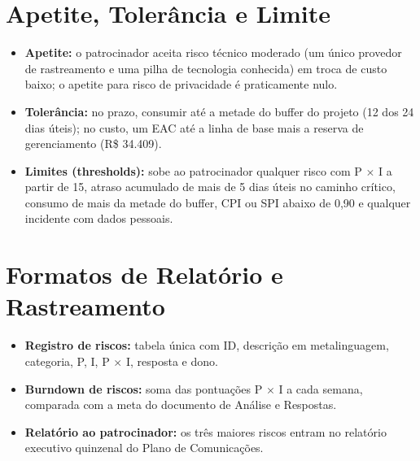 \documentclass[11pt,a4paper]{article}
\begin{document}
\section{Apetite, Tolerância e Limite}
\begin{itemize}[itemsep=3pt]
  \item \textbf{Apetite:} o patrocinador aceita risco técnico moderado (um único provedor de rastreamento e uma pilha de tecnologia conhecida) em troca de custo baixo; o apetite para risco de privacidade é praticamente nulo.
  \item \textbf{Tolerância:} no prazo, consumir até a metade do buffer do projeto (12 dos 24 dias úteis); no custo, um EAC até a linha de base mais a reserva de gerenciamento (R\$ 34.409).
  \item \textbf{Limites (thresholds):} sobe ao patrocinador qualquer risco com P $\times$ I a partir de 15, atraso acumulado de mais de 5 dias úteis no caminho crítico, consumo de mais da metade do buffer, CPI ou SPI abaixo de 0,90 e qualquer incidente com dados pessoais.
\end{itemize}

\section{Formatos de Relatório e Rastreamento}
\begin{itemize}[itemsep=2pt]
  \item \textbf{Registro de riscos:} tabela única com ID, descrição em metalinguagem, categoria, P, I, P $\times$ I, resposta e dono.
  \item \textbf{Burndown de riscos:} soma das pontuações P $\times$ I a cada semana, comparada com a meta do documento de Análise e Respostas.
  \item \textbf{Relatório ao patrocinador:} os três maiores riscos entram no relatório executivo quinzenal do Plano de Comunicações.
\end{itemize}
\end{document}
